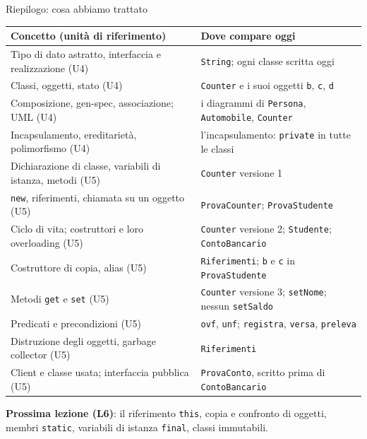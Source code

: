 \documentclass[10pt,aspectratio=169]{beamer}
\begin{document}
\begin{frame}{Riepilogo: cosa abbiamo trattato}
\footnotesize
\begin{center}
\renewcommand{\arraystretch}{1.25}
\begin{tabular}{|l|l|}
\hline
\textbf{Concetto (unità di riferimento)} & \textbf{Dove compare oggi} \\
\hline
Tipo di dato astratto, interfaccia e realizzazione (U4) & \texttt{String}; ogni classe scritta oggi \\
\hline
Classi, oggetti, stato (U4) & \texttt{Counter} e i suoi oggetti \texttt{b}, \texttt{c}, \texttt{d} \\
\hline
Composizione, gen-spec, associazione; UML (U4) & i diagrammi di \texttt{Persona}, \texttt{Automobile}, \texttt{Counter} \\
\hline
Incapsulamento, ereditarietà, polimorfismo (U4) & l'incapsulamento: \texttt{private} in tutte le classi \\
\hline
Dichiarazione di classe, variabili di istanza, metodi (U5) & \texttt{Counter} versione 1 \\
\hline
\texttt{new}, riferimenti, chiamata su un oggetto (U5) & \texttt{ProvaCounter}; \texttt{ProvaStudente} \\
\hline
Ciclo di vita; costruttori e loro overloading (U5) & \texttt{Counter} versione 2; \texttt{Studente}; \texttt{ContoBancario} \\
\hline
Costruttore di copia, alias (U5) & \texttt{Riferimenti}; \texttt{b} e \texttt{c} in \texttt{ProvaStudente} \\
\hline
Metodi \texttt{get} e \texttt{set} (U5) & \texttt{Counter} versione 3; \texttt{setNome}; nessun \texttt{setSaldo} \\
\hline
Predicati e precondizioni (U5) & \texttt{ovf}, \texttt{unf}; \texttt{registra}, \texttt{versa}, \texttt{preleva} \\
\hline
Distruzione degli oggetti, garbage collector (U5) & \texttt{Riferimenti} \\
\hline
Client e classe usata; interfaccia pubblica (U5) & \texttt{ProvaConto}, scritto prima di \texttt{ContoBancario} \\
\hline
\end{tabular}
\end{center}

\vspace{0.1cm}
\textbf{Prossima lezione (L6)}: il riferimento \texttt{this}, copia e confronto di oggetti, membri \texttt{static}, variabili di istanza \texttt{final}, classi immutabili.
\end{frame}
\end{document}
